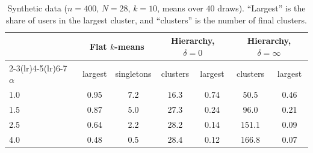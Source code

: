 \begin{table}[h]
\centering
\caption{Synthetic data ($n=400$, $N=28$, $k=10$, means over $40$ draws). ``Largest'' is the share of users in the largest cluster, and ``clusters'' is the number of final clusters.}\label{tab:synth}
\begin{tabular}{lcccccc}
\toprule
& \multicolumn{2}{c}{Flat $k$-means} & \multicolumn{2}{c}{Hierarchy, $\delta=0$} & \multicolumn{2}{c}{Hierarchy, $\delta=\infty$} \\
\cmidrule(lr){2-3}\cmidrule(lr){4-5}\cmidrule(lr){6-7}
$\alpha$ & largest & singletons & clusters & largest & clusters & largest \\
\midrule
1.0 & 0.95 & 7.2 & 16.3 & 0.74 & 50.5 & 0.46 \\
1.5 & 0.87 & 5.0 & 27.3 & 0.24 & 96.0 & 0.21 \\
2.5 & 0.64 & 2.2 & 28.2 & 0.14 & 151.1 & 0.09 \\
4.0 & 0.48 & 0.5 & 28.4 & 0.12 & 166.8 & 0.07 \\
\bottomrule
\end{tabular}
\end{table}
